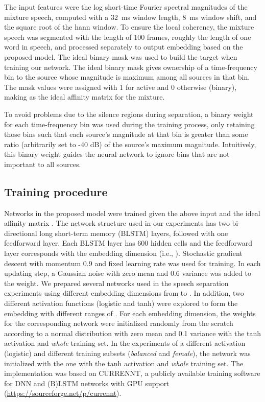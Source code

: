 \documentclass[9pt]{article} \usepackage{nips15submit_e,times}
\begin{document}
The input features  were the log short-time Fourier spectral magnitudes of the mixture speech, computed with a 32~ms window length, 8~ms window shift, and the square root of the hann window.   
To ensure the local coherency, the mixture speech was segmented with the length of 100 frames, roughly the length of one word in speech, and processed separately to output embedding  based on the proposed model.
The ideal binary mask was used to build the target  when training our network. The ideal binary mask gives ownership of a time-frequency bin to the source whose magnitude is maximum among all sources in that bin. The mask values were assigned with 1 for active and 0 otherwise (binary), making  as the ideal affinity matrix for the mixture.
 
To avoid problems due to the silence regions during separation, a binary weight for each time-frequency bin was used during the training process, only retaining those bins such that each source's magnitude at that bin is greater than some ratio (arbitrarily set to -40 dB) of the source's maximum magnitude. 
Intuitively, this binary weight guides the neural network to ignore bins that are not important to all sources. 

\subsection{Training procedure}
\label{sec:train}
Networks in the proposed model were trained given the above input  and the ideal affinity matrix .
The network structure used in our experiments has two bi-directional long short-term memory (BLSTM) layers, followed with one feedforward layer. Each BLSTM layer has 600 hidden cells and the feedforward layer corresponds with the embedding dimension (i.e., ). Stochastic gradient descent with momentum 0.9 and fixed learning rate  was used for training. In each updating step, a Gaussian noise with zero mean and 0.6 variance was added to the weight. 
We prepared several networks used in the speech separation experiments using different embedding dimensions from  to . 
In addition, two different activation functions (logistic and tanh) were explored to form the embedding  with different ranges of .
For each embedding dimension, the weights for the corresponding network were initialized randomly from the scratch according to a normal distribution with zero mean and 0.1 variance with the tanh activation and {\it whole} training set.
In the experiments of a different activation (logistic) and different training subsets ({\it balanced} and {\it female}), the network was initialized with the one with the tanh activation and {\it whole} training set. The implementation was based on CURRENNT, a publicly available training software for DNN and (B)LSTM networks with GPU support ({\small{\url{https://sourceforge.net/p/currennt}}}).
\end{document}
